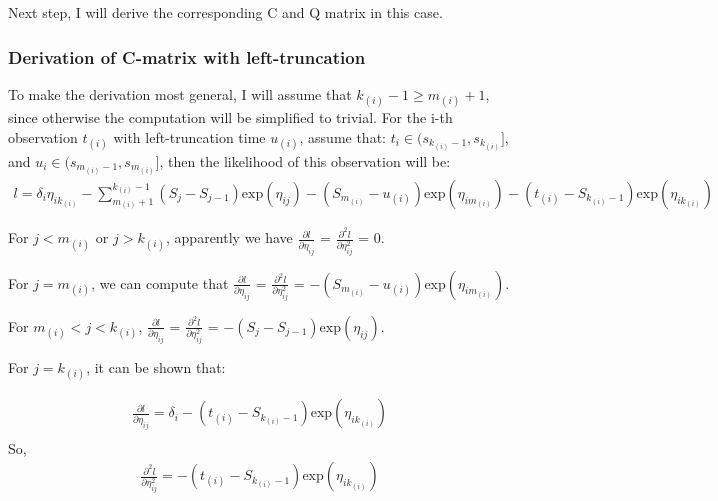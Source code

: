 \documentclass[]{article}
\begin{document}
Next step, I will derive the corresponding C and Q matrix in this case.

\hypertarget{derivation-of-c-matrix-with-left-truncation}{%
\subsubsection{Derivation of C-matrix with
left-truncation}\label{derivation-of-c-matrix-with-left-truncation}}

To make the derivation most general, I will assume that
\(k_{(i)}-1 \geq m_{(i)}+1\), since otherwise the computation will be
simplified to trivial. For the i-th observation \(t_{(i)}\) with
left-truncation time \(u_{(i)}\), assume that:
\(t_i \in (s_{k_{(i)}-1},s_{k_{(i)}}]\), and
\(u_i \in (s_{m_{(i)}-1},s_{m_{(i)}}]\), then the likelihood of this
observation will be:
\begin{equation}\begin{aligned}\label{eqn:ind_i_log}
l = \delta_i \eta_{ik_{(i)}} - \sum_{m_{(i)}+1}^{k_{(i)}-1} (S_j - S_{j-1}) \text{exp}(\eta_{ij}) - (S_{m_{(i)}}-u_{(i)})\text{exp}(\eta_{im_{(i)}})-(t_{(i)}-S_{k_{(i)}-1})\text{exp}(\eta_{ik_{(i)}})
\end{aligned}\end{equation}

For \(j<m_{(i)}\) or \(j>k_{(i)}\), apparently we have
\(\frac{ \partial l}{\partial \eta_{ij}}\) =
\(\frac{ \partial^2 l}{\partial \eta_{ij}^2}\) = 0.

For \(j = m_{(i)}\), we can compute that
\(\frac{ \partial l}{\partial \eta_{ij}}\) =
\(\frac{ \partial^2 l}{\partial \eta_{ij}^2}\) =
\(- (S_{m_{(i)}}-u_{(i)})\text{exp}(\eta_{im_{(i)}})\).

For \(m_{(i)} < j < k_{(i)}\),
\(\frac{ \partial l}{\partial \eta_{ij}}\) =
\(\frac{ \partial^2 l}{\partial \eta_{ij}^2}\) =
\(- (S_j-S_{j-1})\text{exp}(\eta_{ij})\).

For \(j = k_{(i)}\), it can be shown that:

\begin{equation}\begin{aligned}\label{eqn:smalladd}
\frac{ \partial l}{\partial \eta_{ij}} = \delta_i - (t_{(i)}-S_{k_{(i)}-1})\text{exp}(\eta_{ik_{(i)}}) \\
\end{aligned}\end{equation} So,
\begin{equation}\begin{aligned}\label{eqn:smalladd2}
\frac{ \partial^2 l}{\partial \eta_{ij}^2} = - (t_{(i)}-S_{k_{(i)}-1})\text{exp}(\eta_{ik_{(i)}})
\end{aligned}\end{equation}
\end{document}
